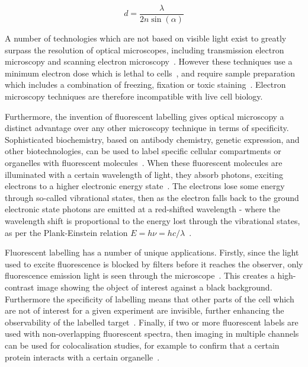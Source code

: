\begin{equation} \label{eq:abbe}
d = \frac{\lambda}{2n\sin\left (\alpha  \right )}\end{equation}

A number of technologies which are not based on visible light exist to greatly surpass the resolution of optical microscopes, including transmission electron microscopy and scanning electron microscopy~\cite{reinhold1931configuration, wells2006early, reimer2013transmission}.
However these techniques use a minimum electron dose which is lethal to cells~\cite{de2016live}, and require sample preparation which includes a combination of freezing, fixation or toxic staining~\cite{kuo2007electron}.
Electron microscopy techniques are therefore incompatible with live cell biology.

Furthermore, the invention of fluorescent labelling gives optical microscopy a distinct advantage over any other microscopy technique in terms of specificity. 
Sophisticated biochemistry, based on antibody chemistry, genetic expression, and other biotechnologies, can be used to label specific cellular compartments or organelles with fluorescent molecules~\cite{day2014fluorescent}. 
When these fluorescent molecules are illuminated with a certain wavelength of light, they absorb photons, exciting electrons to a higher electronic energy state~\cite[\textit{ch. 1}]{lakowicz2007principles}. 
The electrons lose some energy through so-called vibrational states, then as the electron falls back to the ground electronic state photons are emitted at a red-shifted wavelength - where the wavelength shift is proportional to the energy lost through the vibrational states, as per the Plank-Einstein relation $E=h\nu=hc/\lambda$~\cite[\textit{ch. 39}]{halliday2010principles}. 

Fluorescent labelling has a number of unique applications. 
Firstly, since the light used to excite fluorescence is blocked by filters before it reaches the observer, only fluorescence emission light is seen through the microscope~\cite{ploem1967use}. 
This creates a high-contrast image showing the object of interest against a black background. 
Furthermore the specificity of labelling means that other parts of the cell which are not of interest for a given experiment are invisible, further enhancing the observability of the labelled target~\cite{day2014fluorescent}.
Finally, if two or more fluorescent labels are used with non-overlapping fluorescent spectra, then imaging in multiple channels can be used for colocalisation studies, for example to confirm that a certain protein interacts with a certain organelle~\cite{dunn2011practical}. 


